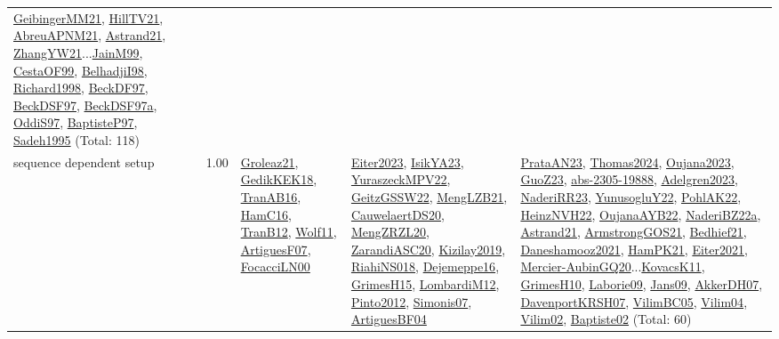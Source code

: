 {\begin{longtable}{p{3cm}r>{\raggedright\arraybackslash}p{6cm}>{\raggedright\arraybackslash}p{6cm}>{\raggedright\arraybackslash}p{8cm}}
\hyperref[detail:GeibingerMM21]{GeibingerMM21}, \hyperref[detail:HillTV21]{HillTV21}, \hyperref[detail:AbreuAPNM21]{AbreuAPNM21}, \hyperref[detail:Astrand21]{Astrand21}, \hyperref[detail:ZhangYW21]{ZhangYW21}...\hyperref[detail:JainM99]{JainM99}, \hyperref[detail:CestaOF99]{CestaOF99}, \hyperref[detail:BelhadjiI98]{BelhadjiI98}, \hyperref[detail:Richard1998]{Richard1998}, \hyperref[detail:BeckDF97]{BeckDF97}, \hyperref[detail:BeckDSF97]{BeckDSF97}, \hyperref[detail:BeckDSF97a]{BeckDSF97a}, \hyperref[detail:OddiS97]{OddiS97}, \hyperref[detail:BaptisteP97]{BaptisteP97}, \hyperref[detail:Sadeh1995]{Sadeh1995} (Total: 118)\\
\index{sequence dependent setup}\index{Concepts!sequence dependent setup}sequence dependent setup &  1.00 & \hyperref[detail:Groleaz21]{Groleaz21}, \hyperref[detail:GedikKEK18]{GedikKEK18}, \hyperref[detail:TranAB16]{TranAB16}, \hyperref[detail:HamC16]{HamC16}, \hyperref[detail:TranB12]{TranB12}, \hyperref[detail:Wolf11]{Wolf11}, \hyperref[detail:ArtiguesF07]{ArtiguesF07}, \hyperref[detail:FocacciLN00]{FocacciLN00} & \hyperref[detail:Eiter2023]{Eiter2023}, \hyperref[detail:IsikYA23]{IsikYA23}, \hyperref[detail:YuraszeckMPV22]{YuraszeckMPV22}, \hyperref[detail:GeitzGSSW22]{GeitzGSSW22}, \hyperref[detail:MengLZB21]{MengLZB21}, \hyperref[detail:CauwelaertDS20]{CauwelaertDS20}, \hyperref[detail:MengZRZL20]{MengZRZL20}, \hyperref[detail:ZarandiASC20]{ZarandiASC20}, \hyperref[detail:Kizilay2019]{Kizilay2019}, \hyperref[detail:RiahiNS018]{RiahiNS018}, \hyperref[detail:Dejemeppe16]{Dejemeppe16}, \hyperref[detail:GrimesH15]{GrimesH15}, \hyperref[detail:LombardiM12]{LombardiM12}, \hyperref[detail:Pinto2012]{Pinto2012}, \hyperref[detail:Simonis07]{Simonis07}, \hyperref[detail:ArtiguesBF04]{ArtiguesBF04} & \hyperref[detail:PrataAN23]{PrataAN23}, \hyperref[detail:Thomas2024]{Thomas2024}, \hyperref[detail:Oujana2023]{Oujana2023}, \hyperref[detail:GuoZ23]{GuoZ23}, \hyperref[detail:abs-2305-19888]{abs-2305-19888}, \hyperref[detail:Adelgren2023]{Adelgren2023}, \hyperref[detail:NaderiRR23]{NaderiRR23}, \hyperref[detail:YunusogluY22]{YunusogluY22}, \hyperref[detail:PohlAK22]{PohlAK22}, \hyperref[detail:HeinzNVH22]{HeinzNVH22}, \hyperref[detail:OujanaAYB22]{OujanaAYB22}, \hyperref[detail:NaderiBZ22a]{NaderiBZ22a}, \hyperref[detail:Astrand21]{Astrand21}, \hyperref[detail:ArmstrongGOS21]{ArmstrongGOS21}, \hyperref[detail:Bedhief21]{Bedhief21}, \hyperref[detail:Daneshamooz2021]{Daneshamooz2021}, \hyperref[detail:HamPK21]{HamPK21}, \hyperref[detail:Eiter2021]{Eiter2021}, \hyperref[detail:Mercier-AubinGQ20]{Mercier-AubinGQ20}...\hyperref[detail:KovacsK11]{KovacsK11}, \hyperref[detail:GrimesH10]{GrimesH10}, \hyperref[detail:Laborie09]{Laborie09}, \hyperref[detail:Jans09]{Jans09}, \hyperref[detail:AkkerDH07]{AkkerDH07}, \hyperref[detail:DavenportKRSH07]{DavenportKRSH07}, \hyperref[detail:VilimBC05]{VilimBC05}, \hyperref[detail:Vilim04]{Vilim04}, \hyperref[detail:Vilim02]{Vilim02}, \hyperref[detail:Baptiste02]{Baptiste02} (Total: 60)\\

\end{longtable}}
